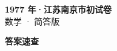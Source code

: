 \documentclass[zihao=-4, a4paper]{ctexart}
\begin{document}
\begin{center}
  {\Large\bfseries 1977 年·江苏南京市初试卷}\\[4pt]
  {\large 数学 · 简答版}
\end{center}
\medskip
{}

\clearpage
{}
\begin{center}{\Large\bfseries 答案速查}\end{center}
\medskip

\end{document}
